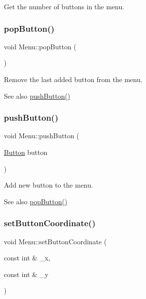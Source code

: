 Get the number of buttons in the menu. 

\mbox{\label{class_menu_a674cd38ddc325b22ec9364e7f83f0b6d}} 
\subsubsection{\texorpdfstring{pop\+Button()}{popButton()}}
{\footnotesize\ttfamily void Menu\+::pop\+Button (\begin{DoxyParamCaption}{ }\end{DoxyParamCaption})}



Remove the last added button from the menu. 

\begin{DoxySeeAlso}{See also}
\mbox{\hyperlink{class_menu_aec502b8f392fd6c88078f95522d9b50d}{push\+Button()}} 
\end{DoxySeeAlso}
\mbox{\label{class_menu_aec502b8f392fd6c88078f95522d9b50d}} 
\subsubsection{\texorpdfstring{push\+Button()}{pushButton()}}
{\footnotesize\ttfamily void Menu\+::push\+Button (\begin{DoxyParamCaption}\item[{\mbox{\hyperlink{class_button}{Button}}}]{button }\end{DoxyParamCaption})}



Add new button to the menu. 

\begin{DoxySeeAlso}{See also}
\mbox{\hyperlink{class_menu_a674cd38ddc325b22ec9364e7f83f0b6d}{pop\+Button()}} 
\end{DoxySeeAlso}
\mbox{\label{class_menu_a047e58be0fe7583a1a79c2614a986f1b}} 
\subsubsection{\texorpdfstring{set\+Button\+Coordinate()}{setButtonCoordinate()}}
{\footnotesize\ttfamily void Menu\+::set\+Button\+Coordinate (\begin{DoxyParamCaption}\item[{const int \&}]{\+\_\+x,  }\item[{const int \&}]{\+\_\+y }\end{DoxyParamCaption})}



